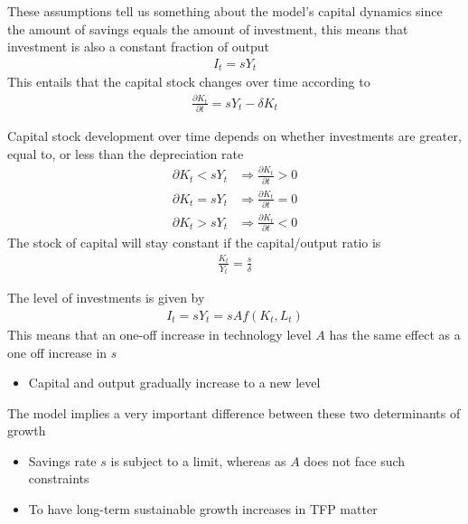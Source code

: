 \documentclass{beamer}
\begin{document}
\begin{frame}
  These assumptions tell us something about the model's capital dynamics since the amount of savings equals the amount of investment, this means that investment is also a constant fraction of output
  \begin{align}
    I_t=sY_t
  \end{align}
  This entails that the capital stock changes over time according to
  \begin{align}
    \frac{\partial K_t}{\partial t}=sY_t-\delta K_t
  \end{align}
\end{frame}

\begin{frame}
    Capital stock development over time depends on whether investments are greater, equal to, or less than the depreciation rate
 \begin{align}
    \partial K_t < sY_t &\Rightarrow \frac{\partial K_t}{\partial t} > 0\\
    \partial K_t = sY_t &\Rightarrow \frac{\partial K_t}{\partial t} = 0\\
    \partial K_t > sY_t &\Rightarrow \frac{\partial K_t}{\partial t} < 0
 \end{align}
 \medskip
 The stock of capital will stay constant if the capital/output ratio is
  \begin{align}
    \frac{K_t}{Y_t} = \frac{s}{\delta}
  \end{align}
\end{frame}

\begin{frame}
  The level of investments is given by
\begin{align}
  I_t=sY_t=sAf(K_t,L_t)
\end{align}
 This means that an one-off increase in technology level $A$ has the same effect as a one off increase in $s$
 \begin{itemize}
   \item Capital and output gradually increase to a new level
 \end{itemize}
 \medskip
 The model implies a very important difference between these two determinants of growth
  \begin{itemize}
    \item Savings rate $s$ is subject to a limit, whereas as $A$ does not face such constraints    
    \item To have long-term sustainable growth increases in TFP matter
  \end{itemize}
\end{frame}
\end{document}
